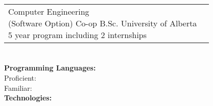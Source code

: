 \documentclass[a4paper]{modernsimplecv}
\begin{document}
\begin{paracol}{2}
    \switchcolumn

\begin{minipage}[t]{\leftcolwidth}
        \vspace{1em}
        \section*{}
        \begin{tabular}{@{\raggedright}p{} |>{\raggedright\arraybackslash}p{}}
            \cvdegree
                {2017--2022}
                {Computer Engineering \newline (Software Option) Co-op}
                {B.Sc.}
                {University of Alberta\newline}
                {5 year program including 2 internships}\\
        \end{tabular}

        \vspace{1em}
        \section*{}
        \begin{minipage}[t]{\textwidth}
            \raggedright
            {\normalsize\textbf{Programming Languages:}}\\
            Proficient:     
               \\
			Familiar:        \\
            {\normalsize\textbf{Technologies: }}
			    \\
        \end{minipage}

        \vspace{0pt}

\end{minipage}
\end{paracol}
\end{document}

